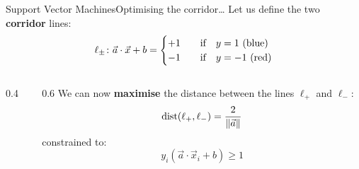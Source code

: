 \begin{frame}{Support Vector Machines}{Optimising the corridor\dots}
    Let us define the two \textbf{corridor} lines:
    \begin{equation*}
        \ell_{\pm}\colon \vec{a} \cdot \vec{x} + b =
        \begin{cases}
            +1 & \qif y = 1~\text{(blue)} \\
            -1 & \qif y = -1~\text{(red)}
        \end{cases}
    \end{equation*}
    \vfill
    \begin{columns}[c]
        \begin{column}{0.4\textwidth}
            \centering
            
        \end{column}
        \hfil
        \begin{column}{0.6\textwidth}
            We can now \textbf{maximise} the distance between the lines $\ell_+$ and $\ell_-$:
            \begin{equation*}
                \operatorname{dist}(\ell_+, \ell_-)
                =
                \frac{2}{\norm{\vec{a}}}
            \end{equation*}
            constrained to:
            \begin{equation*}
                y_i \left( \vec{a} \cdot \vec{x}_i + b \right) \ge 1
            \end{equation*}
        \end{column}
    \end{columns}
\end{frame}

